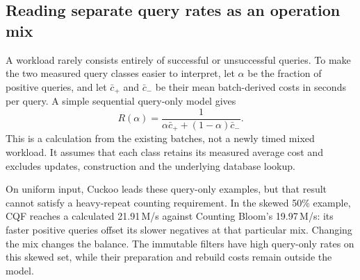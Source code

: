 \subsection{Reading separate query rates as an operation mix}
A workload rarely consists entirely of successful or unsuccessful queries. To make the two measured query classes easier to interpret, let $\alpha$ be the fraction of positive queries, and let $\bar c_+$ and $\bar c_-$ be their mean batch-derived costs in seconds per query. A simple sequential query-only model gives
\begin{equation}
R(\alpha)=\frac{1}{\alpha\bar c_+ +(1-\alpha)\bar c_-}.
\label{eq:query-mix}
\end{equation}
This is a calculation from the existing batches, not a newly timed mixed workload. It assumes that each class retains its measured average cost and excludes updates, construction and the underlying database lookup.

\begin{table}[!htbp]\centering\small
\caption{Calculated query-only throughput in M/s from mean per-query batch costs at 67M operations. The percentage gives $\alpha$, the fraction of positives. The skewed model preserves the measured frequency-weighted positive stream and uniform absent-key negatives. Cuckoo's incomplete skewed workload is unavailable.}
\label{tab:query-mix}

\end{table}

On uniform input, Cuckoo leads these query-only examples, but that result cannot satisfy a heavy-repeat counting requirement. In the skewed 50\% example, CQF reaches a calculated 21.91\,M/s against Counting Bloom's 19.97\,M/s: its faster positive queries offset its slower negatives at that particular mix. Changing the mix changes the balance. The immutable filters have high query-only rates on this skewed set, while their preparation and rebuild costs remain outside the model.

\clearpage

